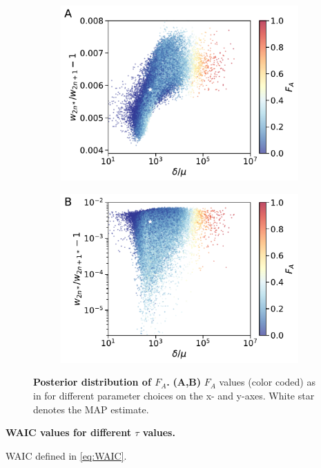 \documentclass[12pt]{extarticle}
\begin{document}
\begin{figure}[p]
	\begin{subfigure}{0.5\textwidth}
      \centering
      \includegraphics[width=\textwidth]{../figures/F_A_delta-mu-ratio_1.pdf}      
	\end{subfigure}
	  \begin{subfigure}{0.5\textwidth}
      \centering
      \includegraphics[width=\textwidth]{../figures/F_A_delta-mu-ratio_2.pdf}
  \end{subfigure}
	\caption{\textbf{Posterior distribution of $F_A$.}
	\textbf{(A,B)} $F_A$ values (color coded) as in  for different parameter choices on the x- and y-axes. White star denotes the MAP estimate.
	}
    \label{fig:posterior_FA_supp}
\end{figure}

\begin{table}[h]
\centering
\caption{
\textbf{WAIC values for different $\tau$ values.}}
\caption*{
	WAIC defined in \cref{eq:WAIC}.
} 
\label{table:WAIC}
\end{table}

\end{document}
